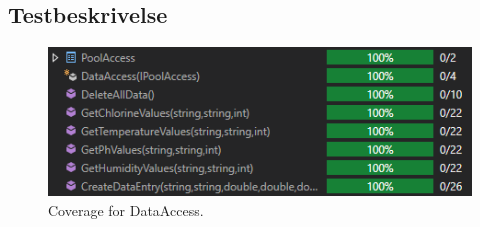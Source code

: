 \subsection{Testbeskrivelse}

\begin{figure}[h]
	\centering
	\includegraphics[width=0.7\linewidth]{figs/test/dataaccesscoverage}
	\caption{Coverage for DataAccess.}
	\label{fig:dataaccesscoverage}
\end{figure}